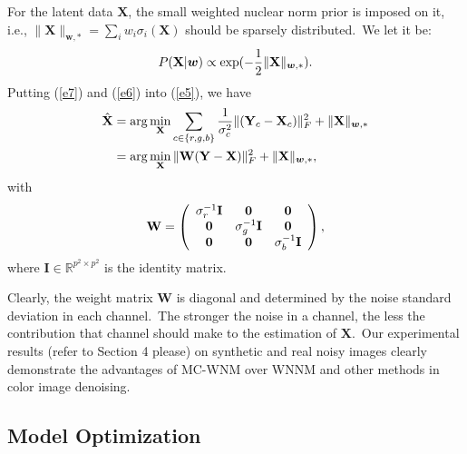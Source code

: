\documentclass[10pt,twocolumn,letterpaper]{article}
\begin{document}
For the latent data $\mathbf{X}$, the small weighted nuclear norm prior is imposed on it, i.e., $\|\mathbf{X}\|_{\bm{w},*}=\sum_{i}w_{i}\sigma_{i}(\mathbf{X})$ should be sparsely distributed.\ We let it be:
\vspace{-4mm}
\begin{equation}
\label{e7}
\vspace{-3mm}
P(\mathbf{X}|\bm{w})
\propto
\exp(-\frac{1}{2}\|\mathbf{X}\|_{\bm{w},*}).
\end{equation}
Putting (\ref{e7}) and (\ref{e6}) into (\ref{e5}), we have
\vspace{-3mm}
\begin{equation}
\label{e8}
\begin{split}
\vspace{-3mm}
\hat{\mathbf{X}}
&
=
\arg\min_{\mathbf{X}}
\sum_{c\in\{r, g, b\}}
\frac{1}{\sigma_{c}^{2}}\|(\mathbf{Y}_{c}-\mathbf{X}_{c})\|_{F}^{2}+\|\mathbf{X}\|_{\bm{w},*}
\\
&
=
\arg\min_{\mathbf{X}}\|\mathbf{W}(\mathbf{Y}-\mathbf{X})\|_{F}^{2}+\|\mathbf{X}\|_{\bm{w},*},
\end{split}
\end{equation}
with
\vspace{-2mm}
\begin{equation}
\label{e9}
\vspace{-3mm}
\mathbf{W}
=
\left( \begin{array}{ccc}
\sigma_{r}^{-1}\mathbf{I} & \mathbf{0} & \mathbf{0}
\\
\mathbf{0} & \sigma_{g}^{-1}\mathbf{I} & \mathbf{0}
\\
\mathbf{0} & \mathbf{0} & \sigma_{b}^{-1}\mathbf{I}
\end{array} \right),
\end{equation}
where $\mathbf{I}
\in\mathbb{R}^{p^{2}\times p^{2}}$ is the identity matrix. 

Clearly, the weight matrix $\mathbf{W}$ is diagonal and determined by the noise standard deviation in each channel.\ The stronger the noise in a channel, the less the contribution that channel should make to the estimation of $\mathbf{X}$.\ Our experimental results (refer to Section 4 please) on synthetic and real noisy images clearly demonstrate the advantages of MC-WNM over WNNM and other methods in color image denoising. 

\subsection{Model Optimization}
\end{document}
